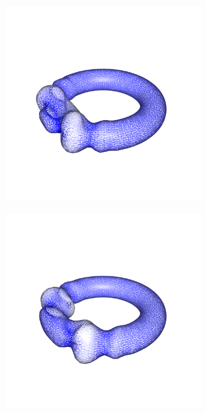 \documentclass[crop=false]{standalone}
\begin{document}
\begin{figure}[b]
      \begin{subfigure}[b]{0.24\textwidth}
        \center
        \includegraphics[trim={0.2cm 3.9cm 3.15cm 5.8cm},clip,width=0.95\textwidth]{images/torus_wave_4.png}
        \caption{}
      \end{subfigure}
      \begin{subfigure}[b]{0.24\textwidth}
        \center
        \includegraphics[trim={0.2cm 3.9cm 3.15cm 5.8cm},clip,width=0.95\textwidth]{images/torus_wave_5.png}

\end{subfigure}
\end{figure}
\end{document}
